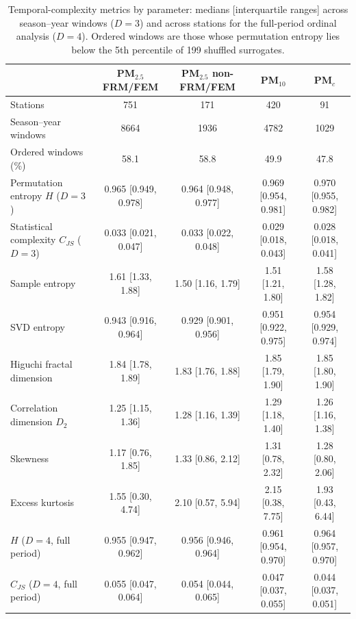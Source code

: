 \documentclass[a4paper,fleqn]{cas-sc}
\begin{document}
\begin{table}[!htbp]
\centering
\footnotesize
\caption{Temporal-complexity metrics by parameter: medians [interquartile ranges] across season--year windows ($D=3$) and across stations for the full-period ordinal analysis ($D=4$). Ordered windows are those whose permutation entropy lies below the 5th percentile of 199 shuffled surrogates.}
\label{tab:complexity_summary}
\setlength{\tabcolsep}{4pt}
\begin{tabular}{lcccc}
\toprule
 & \textbf{PM$_{2.5}$ FRM/FEM} & \textbf{PM$_{2.5}$ non-FRM/FEM} & \textbf{PM$_{10}$} & \textbf{PM$_{c}$} \\
\midrule
Stations & 751 & 171 & 420 & 91 \\
Season--year windows & 8664 & 1936 & 4782 & 1029 \\
Ordered windows (\%) & 58.1 & 58.8 & 49.9 & 47.8 \\
\midrule
Permutation entropy $H$ ($D=3$) & 0.965 [0.949, 0.978] & 0.964 [0.948, 0.977] & 0.969 [0.954, 0.981] & 0.970 [0.955, 0.982] \\
Statistical complexity $C_{JS}$ ($D=3$) & 0.033 [0.021, 0.047] & 0.033 [0.022, 0.048] & 0.029 [0.018, 0.043] & 0.028 [0.018, 0.041] \\
Sample entropy & 1.61 [1.33, 1.88] & 1.50 [1.16, 1.79] & 1.51 [1.21, 1.80] & 1.58 [1.28, 1.82] \\
SVD entropy & 0.943 [0.916, 0.964] & 0.929 [0.901, 0.956] & 0.951 [0.922, 0.975] & 0.954 [0.929, 0.974] \\
Higuchi fractal dimension & 1.84 [1.78, 1.89] & 1.83 [1.76, 1.88] & 1.85 [1.79, 1.90] & 1.85 [1.80, 1.90] \\
Correlation dimension $D_2$ & 1.25 [1.15, 1.36] & 1.28 [1.16, 1.39] & 1.29 [1.18, 1.40] & 1.26 [1.16, 1.38] \\
Skewness & 1.17 [0.76, 1.85] & 1.33 [0.86, 2.12] & 1.31 [0.78, 2.32] & 1.28 [0.80, 2.06] \\
Excess kurtosis & 1.55 [0.30, 4.74] & 2.10 [0.57, 5.94] & 2.15 [0.38, 7.75] & 1.93 [0.43, 6.44] \\
\midrule
$H$ ($D=4$, full period) & 0.955 [0.947, 0.962] & 0.956 [0.946, 0.964] & 0.961 [0.954, 0.970] & 0.964 [0.957, 0.970] \\
$C_{JS}$ ($D=4$, full period) & 0.055 [0.047, 0.064] & 0.054 [0.044, 0.065] & 0.047 [0.037, 0.055] & 0.044 [0.037, 0.051] \\
\bottomrule
\end{tabular}
\end{table}
\end{document}
